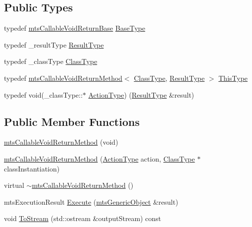 \subsection*{Public Types}
\begin{DoxyCompactItemize}
\item 
typedef \hyperlink{classmts_callable_void_return_base}{mts\+Callable\+Void\+Return\+Base} \hyperlink{classmts_callable_void_return_method_a01907ccc09041bebecb2085a84f74bb1}{Base\+Type}
\item 
typedef \+\_\+result\+Type \hyperlink{classmts_callable_void_return_method_af01afd5ee66910d12e6fc9703a976260}{Result\+Type}
\item 
typedef \+\_\+class\+Type \hyperlink{classmts_callable_void_return_method_a2bea77e5dd239ec2a1d3558dd3ca1776}{Class\+Type}
\item 
typedef \hyperlink{classmts_callable_void_return_method}{mts\+Callable\+Void\+Return\+Method}$<$ \hyperlink{classmts_callable_void_return_method_a2bea77e5dd239ec2a1d3558dd3ca1776}{Class\+Type}, \hyperlink{classmts_callable_void_return_method_af01afd5ee66910d12e6fc9703a976260}{Result\+Type} $>$ \hyperlink{classmts_callable_void_return_method_a03bdd60bba7b2b001dd94270d8a27a5f}{This\+Type}
\item 
typedef void(\+\_\+class\+Type\+::$\ast$ \hyperlink{classmts_callable_void_return_method_a8fcdd120f008efea73b3d51cbb34f773}{Action\+Type}) (\hyperlink{classmts_callable_void_return_method_af01afd5ee66910d12e6fc9703a976260}{Result\+Type} \&result)
\end{DoxyCompactItemize}
\subsection*{Public Member Functions}
\begin{DoxyCompactItemize}
\item 
\hyperlink{classmts_callable_void_return_method_a98d4891da35626a8e9f924c98c75fa7b}{mts\+Callable\+Void\+Return\+Method} (void)
\item 
\hyperlink{classmts_callable_void_return_method_a2cfed63557476b9bdf5995654ed903b8}{mts\+Callable\+Void\+Return\+Method} (\hyperlink{classmts_callable_void_return_method_a8fcdd120f008efea73b3d51cbb34f773}{Action\+Type} action, \hyperlink{classmts_callable_void_return_method_a2bea77e5dd239ec2a1d3558dd3ca1776}{Class\+Type} $\ast$class\+Instantiation)
\item 
virtual \hyperlink{classmts_callable_void_return_method_a5ce2600e928bc28ec4c973636307860f}{$\sim$mts\+Callable\+Void\+Return\+Method} ()
\item 
mts\+Execution\+Result \hyperlink{classmts_callable_void_return_method_a815dd28e94497e91cb0ed1e891a35dad}{Execute} (\hyperlink{classmts_generic_object}{mts\+Generic\+Object} \&result)
\item 
void \hyperlink{classmts_callable_void_return_method_a2ca736ce45432c5cd746227795253ea3}{To\+Stream} (std\+::ostream \&output\+Stream) const 
\end{DoxyCompactItemize}
